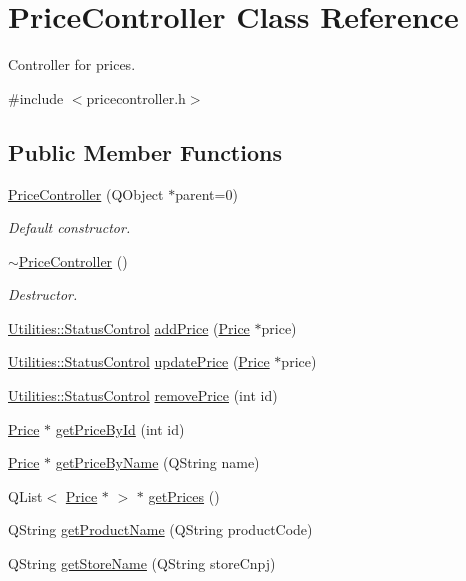 \hypertarget{class_price_controller}{\section{\-Price\-Controller \-Class \-Reference}
\label{class_price_controller}
}


\-Controller for prices.  




{\ttfamily \#include $<$pricecontroller.\-h$>$}

\subsection*{\-Public \-Member \-Functions}
\begin{DoxyCompactItemize}
\item 
\hyperlink{class_price_controller_ac9bff9c2819caa9807ace53df246945a}{\-Price\-Controller} (\-Q\-Object $\ast$parent=0)
\begin{DoxyCompactList}\small\item\em \-Default constructor. \end{DoxyCompactList}\item 
\hyperlink{class_price_controller_a17ea12d878761fee0b0ecd74ed8b8e4c}{$\sim$\-Price\-Controller} ()
\begin{DoxyCompactList}\small\item\em \-Destructor. \end{DoxyCompactList}\item 
\hyperlink{class_utilities_a2974f062d85bdb0c444a1cbe554bf228}{\-Utilities\-::\-Status\-Control} \hyperlink{class_price_controller_a946a37f3bd5373b02f925197b2834ad4}{add\-Price} (\hyperlink{class_price}{\-Price} $\ast$price)
\item 
\hyperlink{class_utilities_a2974f062d85bdb0c444a1cbe554bf228}{\-Utilities\-::\-Status\-Control} \hyperlink{class_price_controller_a65a61ee1bc1dac8c1d47f0015bbde0ef}{update\-Price} (\hyperlink{class_price}{\-Price} $\ast$price)
\item 
\hyperlink{class_utilities_a2974f062d85bdb0c444a1cbe554bf228}{\-Utilities\-::\-Status\-Control} \hyperlink{class_price_controller_a279fe26e40b8fcce29e71a7b7df59f18}{remove\-Price} (int id)
\item 
\hyperlink{class_price}{\-Price} $\ast$ \hyperlink{class_price_controller_a1fba0279ddf07d61a8189f628e90c2a9}{get\-Price\-By\-Id} (int id)
\item 
\hyperlink{class_price}{\-Price} $\ast$ \hyperlink{class_price_controller_af589ffa16c349a48298373a11c412cb1}{get\-Price\-By\-Name} (\-Q\-String name)
\item 
\-Q\-List$<$ \hyperlink{class_price}{\-Price} $\ast$ $>$ $\ast$ \hyperlink{class_price_controller_a9536701f40121f7e4e7193abf5493fa9}{get\-Prices} ()
\item 
\-Q\-String \hyperlink{class_price_controller_a5fd7025bc7d1e64dc106dcb6631e237d}{get\-Product\-Name} (\-Q\-String product\-Code)
\item 
\-Q\-String \hyperlink{class_price_controller_ad153ccec9544c787d5d25ed135f12e81}{get\-Store\-Name} (\-Q\-String store\-Cnpj)
\end{DoxyCompactItemize}


